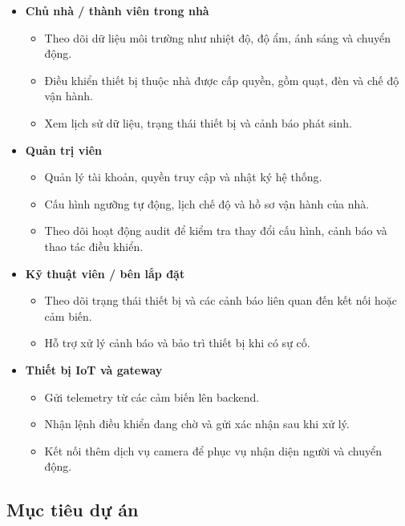 \begin{itemize}

    \item \textbf{Chủ nhà / thành viên trong nhà}
    \begin{itemize}
        \item Theo dõi dữ liệu môi trường như nhiệt độ, độ ẩm, ánh sáng và chuyển động.
        \item Điều khiển thiết bị thuộc nhà được cấp quyền, gồm quạt, đèn và chế độ vận hành.
        \item Xem lịch sử dữ liệu, trạng thái thiết bị và cảnh báo phát sinh.
    \end{itemize}

    \item \textbf{Quản trị viên}
    \begin{itemize}
        \item Quản lý tài khoản, quyền truy cập và nhật ký hệ thống.
        \item Cấu hình ngưỡng tự động, lịch chế độ và hồ sơ vận hành của nhà.
        \item Theo dõi hoạt động audit để kiểm tra thay đổi cấu hình, cảnh báo và thao tác điều khiển.
    \end{itemize}

    \item \textbf{Kỹ thuật viên / bên lắp đặt}
    \begin{itemize}
        \item Theo dõi trạng thái thiết bị và các cảnh báo liên quan đến kết nối hoặc cảm biến.
        \item Hỗ trợ xử lý cảnh báo và bảo trì thiết bị khi có sự cố.
    \end{itemize}

    \item \textbf{Thiết bị IoT và gateway}
    \begin{itemize}
        \item Gửi telemetry từ các cảm biến lên backend.
        \item Nhận lệnh điều khiển đang chờ và gửi xác nhận sau khi xử lý.
        \item Kết nối thêm dịch vụ camera để phục vụ nhận diện người và chuyển động.
    \end{itemize}

\end{itemize}

\subsection{Mục tiêu dự án}


